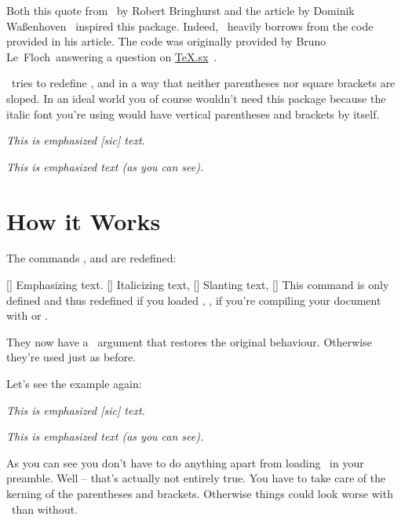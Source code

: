 \documentclass[load-preamble+]{cnltx-doc}
\begin{document}
\noindent
Both this quote from~ by Robert Bringhurst and the
article  by Dominik Waßenhoven~\cite{dtk12-dw} inspired
this package.  Indeed, \embrac\ heavily borrows from the code
\citeauthor{dtk12-dw} provided in his article\manythanks. The code was
originally provided by Bruno Le~Floch\manythanks\ answering a question on
\href{http://tex.stackexchange.com}{TeX.sx}~\cite{lefloch11}.

\embrac\ tries to redefine ,  and
 in a way that neither parentheses nor
square brackets are sloped.  In an ideal world you of course wouldn't need
this package because the italic font you're using would have vertical
parentheses and brackets by itself.

\begin{example}
  \emph{This is emphasized [sic] text.} \par
  \emph{This is emphasized text (as you can see).}
\end{example}

\section{How it Works}
The commands ,  and  are redefined:
\begin{commands}
  [\sarg{}]
    Emphasizing text.
  [\sarg{}]
    Italicizing text,
  [\sarg{}]
    Slanting text,
  [\sarg{}]
    This command is only defined and thus redefined if you loaded
    , \ie, if you're compiling your document with \XeLaTeX{} or
    \LuaLaTeX.
\end{commands}
They now have a \sarg\ argument that restores the original behaviour.
Otherwise they're used just as before.

Let's see the example again:
\begin{example}
  \emph{This is emphasized [sic] text.} \par
  \emph{This is emphasized text (as you can see).}
\end{example}
As you can see you don't have to do anything apart from loading \embrac\ in
your preamble.  Well -- that's actually not entirely true.  You have to take
care of the kerning of the parentheses and brackets.  Otherwise things could
look worse with \embrac\ than without.
\end{document}
